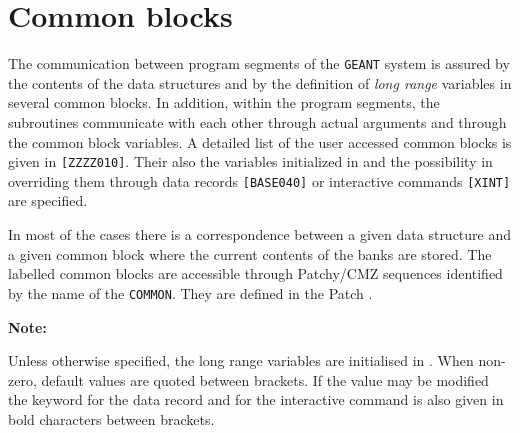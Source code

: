 \section{Common blocks}
The communication between program segments of the {\tt GEANT} system
is assured by the contents of the data structures and by the definition
of {\it long range} variables in several common blocks.
In addition, within the program segments,
the subroutines communicate with each other through actual arguments
and through the common block variables. A detailed list of the 
user accessed common blocks is given in  {\tt [ZZZZ010]}. 
Their also the variables initialized in  and the possibility
in overriding them through data records {\tt [BASE040]} or 
interactive commands {\tt [XINT]} are specified.
 
In most of the cases there is a correspondence between a
given data structure and a given common block where the current contents of
the banks are stored.
The labelled common blocks are accessible through Patchy/CMZ sequences
identified by the name of the {\tt COMMON}. They are defined in the Patch
.
 
{\bf Note:}
 
Unless otherwise specified, the long range variables are
initialised in . When non-zero, default values are
quoted between brackets. If the value may be modified
the keyword for the data record and for the interactive
command is also given in bold characters between brackets.
 

 
 
